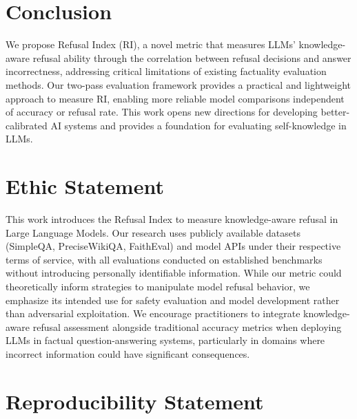 \documentclass{article} %
\theoremstyle{definition}
\begin{document}
\vspace{-0.7em}
\section{Conclusion}
\vspace{-0.7em}

We propose Refusal Index (RI), a novel metric that measures LLMs' knowledge-aware refusal ability through the correlation between refusal decisions and answer incorrectness, addressing critical limitations of existing factuality evaluation methods. 
Our two-pass evaluation framework provides a practical and lightweight approach to measure RI, enabling more reliable model comparisons independent of accuracy or refusal rate. 
This work opens new directions for developing better-calibrated AI systems and provides a foundation for evaluating self-knowledge in LLMs.

\vspace{-0.7em}
\section*{Ethic Statement}
\vspace{-0.7em}

This work introduces the Refusal Index to measure knowledge-aware refusal in Large Language Models. Our research uses publicly available datasets (SimpleQA, PreciseWikiQA, FaithEval) and model APIs under their respective terms of service, with all evaluations conducted on established benchmarks without introducing personally identifiable information. While our metric could theoretically inform strategies to manipulate model refusal behavior, we emphasize its intended use for safety evaluation and model development rather than adversarial exploitation. We encourage practitioners to integrate knowledge-aware refusal assessment alongside traditional accuracy metrics when deploying LLMs in factual question-answering systems, particularly in domains where incorrect information could have significant consequences.

\vspace{-0.7em}
\section*{Reproducibility Statement}
\vspace{-0.7em}
\end{document}
